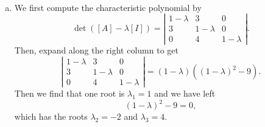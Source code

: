 \documentclass[12pt]{article} %
\begin{document}
\begin{solution}~
\begin{enumerate}[(a)]
    \item We first compute the characteristic polynomial by
    \[
    \det([A]-\lambda[I]) = \left| \begin{matrix} 1 - \lambda & 3 & 0 \\ 3 & 1-\lambda & 0 \\ 0 & 4 & 1-\lambda \end{matrix}\right|.
    \]
    Then, expand along the right column to get
    \[
    \left| \begin{matrix} 1 - \lambda & 3 & 0 \\ 3 & 1-\lambda & 0 \\ 0 & 4 & 1-\lambda \end{matrix}\right| = (1-\lambda)((1-\lambda)^2-9).
    \]
    Then we find that one root is $\lambda_1=1$ and we have left
    \[
    (1-\lambda)^2-9=0,
    \]
    which has the roots $\lambda_2=-2$ and $\lambda_3=4$. 
    

\end{enumerate}
\end{solution}
\end{document}

